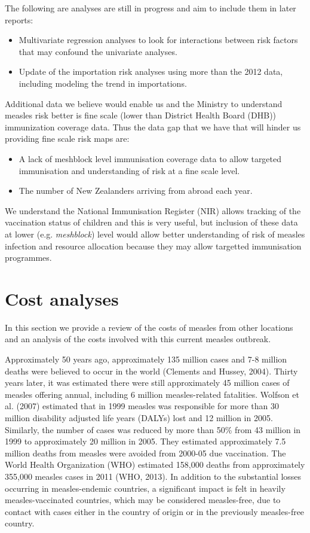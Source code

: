 \documentclass{article}
\begin{document}
The following are analyses are still in progress and aim to include them in later reports:
\begin{itemize}
\item Multivariate regression analyses to look for interactions between risk factors that may confound the univariate analyses.
\item Update of the importation risk analyses using more than the 2012 data, including modeling the trend in importations.
\end{itemize}
Additional data we believe would enable us and the Ministry to understand measles risk better is fine scale (lower than District Health Board (DHB)) immunization coverage data. Thus the data gap that we have that will hinder us providing fine scale risk maps are:
\begin{itemize}
\item A lack of meshblock level immunisation coverage data to allow targeted immunisation and understanding of risk at a fine scale level.
\item The number of New Zealanders arriving from abroad each year.
\end{itemize}

We understand the National Immunisation Register (NIR) allows tracking of the vaccination status of children and this is very useful, but inclusion of these data at lower (e.g. \emph{meshblock}) level would allow better understanding of risk of measles infection and resource allocation because they may allow targetted immunisation programmes.

\section{Cost analyses}

In this section we provide a review of the costs of measles from other locations and an analysis of the costs involved with this current measles outbreak.

Approximately 50 years ago, approximately 135 million cases and 7-8 million deaths were believed to occur in the world (Clements and Hussey, 2004). Thirty years later, it was estimated there were still approximately 45 million cases of measles offering annual, including 6 million measles-related fatalities. Wolfson et al. (2007) estimated that in 1999 measles was responsible for more than 30 million disability adjusted life years (DALYs) lost and 12 million in 2005. Similarly, the number of cases was reduced by more than 50\% from 43 million in 1999 to approximately 20 million in 2005. They estimated approximately 7.5 million deaths from measles were avoided from 2000-05 due vaccination. The World Health Organization (WHO) estimated 158,000 deaths from approximately 355,000 measles cases in 2011 (WHO, 2013).  In addition to the substantial losses occurring in measles-endemic countries, a significant impact is felt in heavily measles-vaccinated countries, which may be considered measles-free, due to contact with cases either in the country  of origin or in the previously measles-free country.
\end{document}
